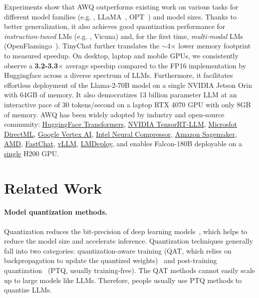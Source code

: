 Experiments show that AWQ outperforms existing work on various tasks for  different model families (e.g. , LLaMA~\cite{touvron2023llama}, OPT~\cite{opt}) and model sizes.  Thanks to better generalization, it also achieves good quantization performance for \emph{instruction-tuned} LMs (e.g. , Vicuna) and, for the first time, \emph{multi-modal} LMs (OpenFlamingo~\cite{openflamingo}). TinyChat further translates the $\sim$4$\times$ lower memory footprint to measured speedup. On desktop, laptop and mobile GPUs, we consistently observe a \textbf{3.2-3.3}$\times$ average speedup compared to the FP16 implementation by Huggingface across a diverse spectrum of LLMs. Furthermore, it facilitates effortless deployment of the Llama-2-70B model on a single NVIDIA Jetson Orin with 64GB of memory. It also democratizes 13 billion parameter LLM at an interactive pace of 30 tokens/second on a laptop RTX 4070 GPU with only 8GB of memory.  AWQ has been widely adopted by industry and open-source community: \href{https://huggingface.co/docs/transformers/main_classes/quantization}{HuggingFace Transformers}, \href{https://github.com/NVIDIA/TensorRT-LLM/}{NVIDIA TensorRT-LLM}, \href{https://blogs.windows.com/windowsdeveloper/2024/05/24/quantization-with-directml-helps-you-scale-further-on-windows/}{Microsfot DirectML}, \href{https://console.cloud.google.com/vertex-ai/publishers/meta/model-garden/llama-2-quantized}{Google Vertex AI}, \href{https://github.com/intel/neural-compressor}{Intel Neural Compressor}, \href{https://aws.amazon.com/blogs/machine-learning/boost-inference-performance-for-llms-with-new-amazon-sagemaker-containers/}{Amazon Sagemaker}, \href{https://community.amd.com/t5/ai/reduce-memory-footprint-and-improve-performance-running-llms-on/ba-p/686157}{AMD}, \href{https://github.com/lm-sys/FastChat/blob/main/docs/awq.md}{FastChat}, \href{https://github.com/vllm-project/vllm/blob/main/vllm/model_executor/layers/quantization/awq.py}{vLLM}, \href{https://github.com/InternLM/lmdeploy}{LMDeploy}, and enables Falcon-180B deployable on a \href{https://github.com/NVIDIA/TensorRT-LLM/blob/main/docs/source/blogs/Falcon180B-H200.md}{single} H200 GPU.

\section{Related Work}
\paragraph{Model quantization methods. } Quantization reduces the bit-precision of deep learning models~\cite{han2016deep, jacob2018quantization, nagel2019data, wang2019haq, nagel2020up,lin2020mcunet}, which helps to reduce the model size and accelerate inference. Quantization techniques generally fall into two categories: quantization-aware training (QAT, which relies on backpropagation to update the quantized weights)~\cite{bengio2013estimating, gholami2021survey, nagel2021white, choi2018pact} and post-training quantization~\cite{jacob2018quantization, nagel2019data, nagel2020up} (PTQ, usually training-free). The QAT methods cannot easily scale up to large models like LLMs. Therefore, people usually use PTQ methods to quantize LLMs. 

